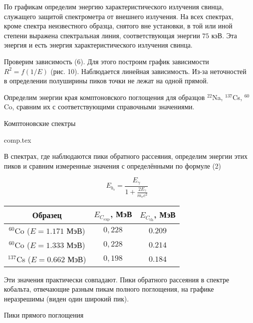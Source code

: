 По графикам определим энергию характеристического излучения свинца, служащего
защитой спектрометра от внешнего излучения. На всех спектрах, кроме спектра
неизвестного образца, снятого вне установки, в той или иной степени выражена
спектральная линия, соответствующая энергии $75$ кэВ. Эта энергия и есть энергия
характеристического излучения свинца.

Проверим зависимость (6). Для этого построим график зависимости $R^2 = f(1/E)$
(рис. 10). Наблюдается линейная зависимость. Из-за неточностей в определении
полуширины пиков точки не лежат на одной прямой.

Определим энергии края комптоновского поглощения для образцов $^{22}$Na,
$^{137}$Cs, $^{60}$Co, сравним их с соответствующими справочными значениями.

\begin{table}
\begin{center}
  \caption{Комптоновские спектры}
  {comp.tex}
\end{center}
\end{table}

В спектрах, где наблюдаются пики обратного рассеяния, определим энергии этих
пиков и сравним измеренные значения с определёнными по формуле (2)

\begin{equation}
  E_{b_s} = \frac{E_{\gamma}}{1 + \frac{2E_{\gamma}}{m_e c^2}}
\end{equation}

\begin{table}
  \begin{center}
  \begin{tabular}{| c | c | c |}
  \hline
  Образец & $E_{C_{\text{exp}}}$, МэВ & $E_{C_{\text{th}}}$, МэВ \\
  \hline
  ${}^{60}$Co ($E = 1.171$ МэВ) & $0,228$ & $0.209$ \\
  \hline
  ${}^{60}$Co ($E = 1.333$ МэВ) & $0,228$ & $0.214$ \\
  \hline
  ${}^{137}$Cs ($E = 0.662$ МэВ) & $0,198$ & $0.184$ \\
  \hline
\end{tabular}
\end{center}
\end{table}

Эти значения практически совпадают. Пики обратного рассеяния в спектре кобальта,
отвечающие разным пикам полного поглощения, на графике неразрешимы (виден один
широкий пик).

\begin{table}[h!]
  \centering
  \caption{Пики прямого поглощения}
  
\end{table}
